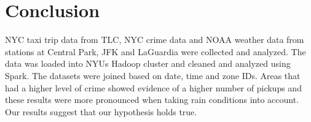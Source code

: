 \documentclass{sigkddExp}
\begin{document}


\section{Conclusion}



NYC taxi trip data from TLC, NYC crime data and NOAA weather data from stations at Central Park, JFK and LaGuardia were collected and analyzed. The data was loaded into NYUs Hadoop cluster and cleaned and analyzed using Spark. The datasets were joined based on date, time and zone IDs. Areas that had a higher level of crime showed evidence of a higher number of pickups and these results were more pronounced when taking rain conditions into account. Our results suggest that our hypothesis holds true. 






 



\end{document}
